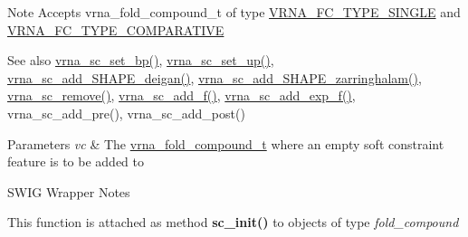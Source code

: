 \begin{DoxyNote}{Note}
Accepts vrna\+\_\+fold\+\_\+compound\+\_\+t of type \hyperlink{group__fold__compound_gga01a4ff86fa71deaaa5d1abbd95a1447da7e264dd3cf2dc9b6448caabcb7763cd6}{V\+R\+N\+A\+\_\+\+F\+C\+\_\+\+T\+Y\+P\+E\+\_\+\+S\+I\+N\+G\+LE} and \hyperlink{group__fold__compound_gga01a4ff86fa71deaaa5d1abbd95a1447dab821ce46ea3cf665be97df22a76f5023}{V\+R\+N\+A\+\_\+\+F\+C\+\_\+\+T\+Y\+P\+E\+\_\+\+C\+O\+M\+P\+A\+R\+A\+T\+I\+VE}
\end{DoxyNote}
\begin{DoxySeeAlso}{See also}
\hyperlink{group__soft__constraints_ga8e4334b24bc91453fbcda490a4e331af}{vrna\+\_\+sc\+\_\+set\+\_\+bp()}, \hyperlink{group__soft__constraints_ga99ed63f3ef9e7fe3997932030487a344}{vrna\+\_\+sc\+\_\+set\+\_\+up()}, \hyperlink{group__SHAPE__reactivities_ga57d612b58e1c61dd6cfcb5a843f8f1b3}{vrna\+\_\+sc\+\_\+add\+\_\+\+S\+H\+A\+P\+E\+\_\+deigan()}, \hyperlink{group__SHAPE__reactivities_gaf3c65a045060aef5c4e41693d30af58c}{vrna\+\_\+sc\+\_\+add\+\_\+\+S\+H\+A\+P\+E\+\_\+zarringhalam()}, \hyperlink{group__soft__constraints_ga73cdc07b9a199c614367bebef0f2c41a}{vrna\+\_\+sc\+\_\+remove()}, \hyperlink{group__soft__constraints_ga8c7d907ec0125cd61c04e0908010a4e9}{vrna\+\_\+sc\+\_\+add\+\_\+f()}, \hyperlink{group__soft__constraints_ga87e382b5d0c9b7d9ce1b79c0473ff700}{vrna\+\_\+sc\+\_\+add\+\_\+exp\+\_\+f()}, vrna\+\_\+sc\+\_\+add\+\_\+pre(), vrna\+\_\+sc\+\_\+add\+\_\+post() 
\end{DoxySeeAlso}

\begin{DoxyParams}{Parameters}
{\em vc} & The \hyperlink{group__fold__compound_ga1b0cef17fd40466cef5968eaeeff6166}{vrna\+\_\+fold\+\_\+compound\+\_\+t} where an empty soft constraint feature is to be added to\\
\hline
\end{DoxyParams}
\begin{DoxyRefDesc}{S\+W\+I\+G Wrapper Notes}
\item[\hyperlink{wrappers__wrappers000015}{S\+W\+I\+G Wrapper Notes}]This function is attached as method {\bfseries sc\+\_\+init()} to objects of type {\itshape fold\+\_\+compound} \end{DoxyRefDesc}
\mbox{\label{group__soft__constraints_ga8e4334b24bc91453fbcda490a4e331af}} 
